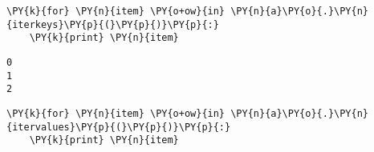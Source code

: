 {\par%
\vspace{-1\baselineskip}%
}%
\begin{notebookcell}[18]%
\begin{addmargin}[\cellleftmargin]{0em}%
{\smaller%
\par%
%
\vspace{-1\smallerfontscale}%
\begin{Verbatim}[commandchars=\\\{\}]
\PY{k}{for} \PY{n}{item} \PY{o+ow}{in} \PY{n}{a}\PY{o}{.}\PY{n}{iterkeys}\PY{p}{(}\PY{p}{)}\PY{p}{:}
    \PY{k}{print} \PY{n}{item}
\end{Verbatim}
%
\par%
\vspace{-1\smallerfontscale}}%
\end{addmargin}
\end{notebookcell}

\par\vspace{1\smallerfontscale}%
    \begin{addmargin}[\cellleftmargin]{0em}%
    {\smaller%
    \vspace{-1\smallerfontscale}%
    
    \begin{Verbatim}[commandchars=\\\{\}]
0
1
2
    \end{Verbatim}
}%
    \end{addmargin}%

{\par%
\vspace{-1\baselineskip}%
}%
\begin{notebookcell}[19]%
\begin{addmargin}[\cellleftmargin]{0em}%
{\smaller%
\par%
%
\vspace{-1\smallerfontscale}%
\begin{Verbatim}[commandchars=\\\{\}]
\PY{k}{for} \PY{n}{item} \PY{o+ow}{in} \PY{n}{a}\PY{o}{.}\PY{n}{itervalues}\PY{p}{(}\PY{p}{)}\PY{p}{:}
    \PY{k}{print} \PY{n}{item}
\end{Verbatim}
%
\par%
\vspace{-1\smallerfontscale}}%
\end{addmargin}
\end{notebookcell}

